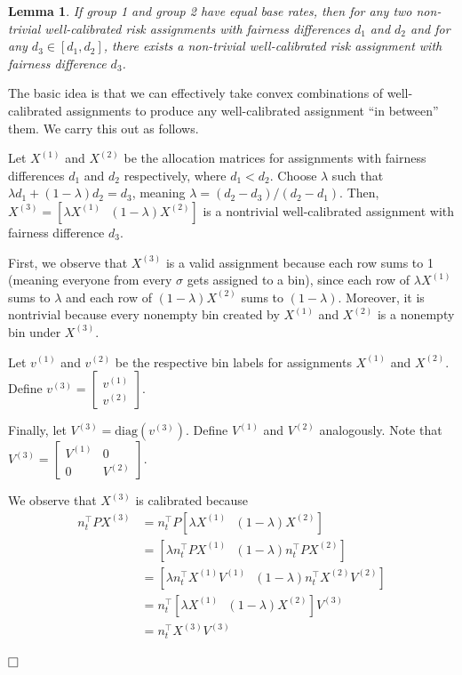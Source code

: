 \documentclass[11pt]{article}
\def\tran{^{\top}}
\def\squarebox#1{\hbox to #1{\hfill\vbox to #1{\vfill}}}
\newcommand{\qed}{\hspace*{\fill}\vbox{\hrule\hbox{\vrule\squarebox{.667em}\vrule}\hrule}\smallskip}
\newenvironment{proof}{\noindent{\bf Proof:~~}}{\(\qed\)}
\newtheorem{lemma}[theorem]{Lemma}
\begin{document}
\begin{lemma}
  If group 1 and group 2 have equal base rates, then for any two non-trivial
  well-calibrated risk assignments with fairness differences $d_1$ and $d_2$ and
  for any $d_3 \in [d_1, d_2]$, there exists a non-trivial well-calibrated risk
  assignment with fairness difference $d_3$.
  \label{lem:diff_convex}
\end{lemma}
\begin{proof}
The basic idea is that we can effectively take convex combinations of
well-calibrated assignments to produce any well-calibrated assignment ``in
between'' them.  We carry this out as follows.

  Let $X^{(1)}$ and $X^{(2)}$ be the allocation matrices for assignments with
  fairness differences $d_1$ and $d_2$ respectively, where $d_1 < d_2$. Choose
  $\lambda$ such that $\lambda d_1 + (1-\lambda) d_2 = d_3$, meaning $\lambda =
  (d_2-d_3)/(d_2-d_1)$. Then, $X^{(3)} = [\lambda X^{(1)} ~~~ (1-\lambda)
  X^{(2)}]$ is a nontrivial well-calibrated assignment with fairness difference
  $d_3$.

  First, we observe that $X^{(3)}$ is a valid assignment because each row sums
  to 1 (meaning everyone from every $\sigma$ gets assigned to a bin), since each
  row of $\lambda X^{(1)}$ sums to $\lambda$ and each row of $(1-\lambda)
  X^{(2)}$ sums to $(1-\lambda)$. Moreover, it is nontrivial because every
  nonempty bin created by $X^{(1)}$ and $X^{(2)}$ is a nonempty bin under
  $X^{(3)}$.

  Let $v^{(1)}$ and $v^{(2)}$ be the respective bin labels for assignments
  $X^{(1)}$ and $X^{(2)}$. Define $\displaystyle{
    v^{(3)} = \begin{bmatrix}
      v^{(1)} \\
      v^{(2)}
    \end{bmatrix}
  }$.

  Finally, let $V^{(3)} = \text{diag}(v^{(3)})$. Define $V^{(1)}$ and
  $V^{(2)}$ analogously.
  Note that
  $\displaystyle{
    V^{(3)} = \begin{bmatrix}
      V^{(1)} & 0 \\
      0 & V^{(2)}
    \end{bmatrix}
  }$.

  We observe that $X^{(3)}$ is calibrated because
  \begin{align*}
    n_t\tran PX^{(3)} &= n_t\tran P [\lambda X^{(1)} ~~~ (1-\lambda)
    X^{(2)}] \\
    &= [\lambda n_t\tran PX^{(1)} ~~~ (1-\lambda) n_t\tran PX^{(2)}] \\
    &= [\lambda n_t\tran X^{(1)} V^{(1)} ~~~ (1-\lambda) n_t\tran
    X^{(2)}V^{(2)}] \\
    &= n_t\tran [\lambda X^{(1)} ~~~ (1-\lambda) X^{(2)}] V^{(3)} \\
    &= n_t\tran X^{(3)}V^{(3)}
  \end{align*}


\end{proof}
\end{document}
